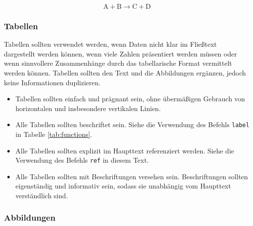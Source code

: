 \documentclass[
	german,
	accentcolor=9c,%
	type=intern,
	marginpar=false
	]{tudapub}
\begin{document}
\begin{equation}
\mathrm{A + B \longrightarrow C + D}
\label{eq:reaction}
\end{equation}

\subsubsection{Tabellen}  %

Tabellen sollten verwendet werden, wenn Daten nicht klar im Fließtext dargestellt werden können, wenn viele Zahlen präsentiert werden müssen oder wenn sinnvollere Zusammenhänge durch das tabellarische Format vermittelt werden können. Tabellen sollten den Text und die Abbildungen ergänzen, jedoch keine Informationen duplizieren.

\begin{itemize}  
\item Tabellen sollten einfach und prägnant sein, ohne übermäßigen Gebrauch von horizontalen und insbesondere vertikalen Linien.
\item Alle Tabellen sollten beschriftet sein. Siehe die Verwendung des Befehls \texttt{label} in Tabelle \ref{tab:functions}.
\item Alle Tabellen sollten explizit im Haupttext referenziert werden. Siehe die Verwendung des Befehls \texttt{ref} in diesem Text.
\item Alle Tabellen sollten mit Beschriftungen versehen sein. Beschriftungen sollten eigenständig und informativ sein, sodass sie unabhängig vom Haupttext verständlich sind.
\end{itemize}

\subsubsection{Abbildungen}  %
\end{document}

